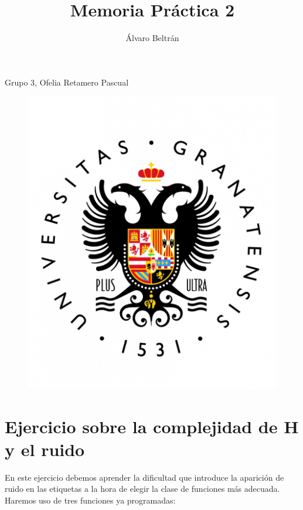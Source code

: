 \documentclass[a4paper,11pt]{article}
\title{Memoria Práctica 2}
\author{Álvaro Beltrán}
\begin{document}
\maketitle
\begin{center}
Grupo 3, Ofelia Retamero Pascual
\end{center}

\begin{figure}[h]
\includegraphics[scale=0.3]{UGR}
\centering
\end{figure}

\newpage

\renewcommand*\contentsname{Índice}
\tableofcontents

\newpage

\section{Ejercicio sobre la complejidad de H y el ruido}

En este ejercicio debemos aprender la dificultad que introduce la aparición de ruido en las etiquetas a la hora de elegir la clase de funciones más adecuada. Haremos uso de tres funciones ya programadas:
\end{document}
